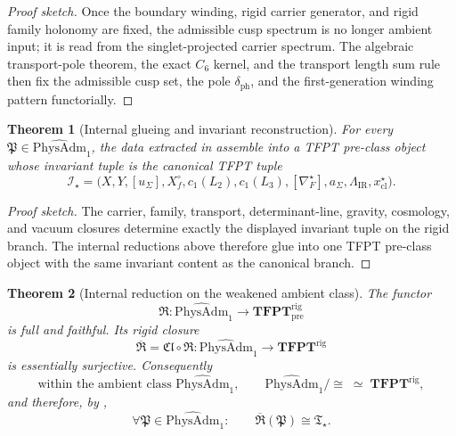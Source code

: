 \documentclass[11pt,a4paper]{article}
\newtheorem{theorem}{Theorem}[section]
\theoremstyle{definition}
\theoremstyle{remark}
\newcommand{\Tstar}{\mathfrak T_{\star}}
\newcommand{\PhysAdmOne}{\widehat{\mathrm{PhysAdm}}_1}
\newcommand{\Runiv}{\mathfrak R}
\newcommand{\Clrig}{\mathfrak{Cl}}
\newcommand{\Runivrig}{\overline{\Runiv}}
\begin{document}
\begin{proof}[Proof sketch]
Once the boundary winding, rigid carrier generator, and rigid family holonomy are fixed,
the admissible cusp spectrum is no longer ambient input; it is read from the singlet-projected
carrier spectrum. The algebraic transport-pole theorem, the exact $C_6$ kernel, and the transport
length sum rule then fix the admissible cusp set, the pole $\delta_{\mathrm{ph}}$, and the
first-generation winding pattern functorially.
\end{proof}

\begin{theorem}[Internal glueing and invariant reconstruction]
\label{prop:universal-glueing}
For every $\mathfrak P\in\PhysAdmOne$, the data extracted in
assemble into a TFPT pre-class object whose invariant tuple is the canonical TFPT tuple
\[
\mathcal I_\star=
\bigl(
    X,Y,[u_\Sigma],X_f^\circ,c_1(L_2),c_1(L_3),[\nabla_F^\star],a_\Sigma,\Lambda_{\mathrm{IR}},x_{\mathrm{cl}}^\star
\bigr).
\]
\end{theorem}

\begin{proof}[Proof sketch]
The carrier, family, transport, determinant-line, gravity, cosmology, and vacuum closures
determine exactly the displayed invariant tuple on the rigid branch. The internal reductions above
therefore glue into one TFPT pre-class object with the same invariant content as the canonical
branch.
\end{proof}

\iffalse
\begin{theorem}[Internal reduction on the weakened ambient class]
\label{thm:universality-tfpt}
The functor
\[
\Runiv:\PhysAdmOne\to \mathbf{TFPT}^{\mathrm{rig}}_{\mathrm{pre}}
\]
is full and faithful. Its rigid closure
\[
\Runivrig=\Clrig\circ \Runiv:\PhysAdmOne\to \mathbf{TFPT}^{\mathrm{rig}}
\]
is essentially surjective. Consequently
\[
\text{within the ambient class }\PhysAdmOne,\qquad
\PhysAdmOne/\!\cong\;\simeq\;\mathbf{TFPT}^{\mathrm{rig}},
\]
and therefore, by ,
\[
\forall \mathfrak P\in\PhysAdmOne:\qquad
\Runivrig(\mathfrak P)\cong \Tstar.
\]
\end{theorem}
\end{document}

